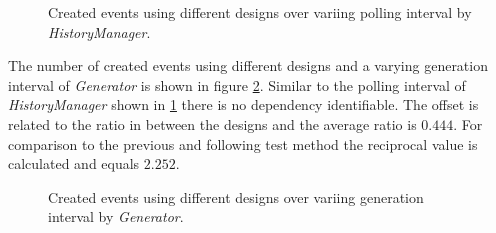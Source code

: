 \begin{figure}
    \centering
    \caption{Created events using different designs over variing polling interval by \emph{HistoryManager}.}
    \label{fig:results_event_polling}
\end{figure}

The number of created events using different designs and a varying generation interval of \emph{Generator} is shown in figure \ref{fig:results_event_generation}.
Similar to the polling interval of \emph{HistoryManager} shown in \ref{fig:results_event_polling} there is no dependency identifiable.
The offset is related to the ratio in between the designs and the average ratio is $0.444$.
For comparison to the previous and following test method the reciprocal value is calculated and equals $2.252$.
\\

\begin{figure}
    \centering
    \caption{Created events using different designs over variing generation interval by \emph{Generator}.}
    \label{fig:results_event_generation}
\end{figure}

